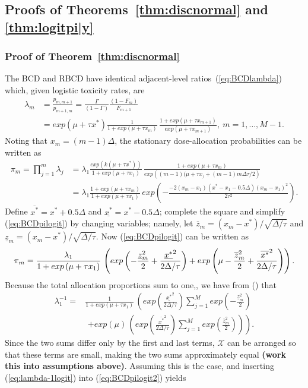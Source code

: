 \subsection{Proofs of Theorems~\ref{thm:discnormal} and \ref{thm:logitpi|y}}\label{sec:logitproofs}
\subsubsection{Proof of Theorem~\ref{thm:discnormal}}
The BCD and RBCD have identical adjacent-level ratios~(\ref{eq:BCDlambda}) which, given logistic toxicity rates, are
\begin{align*}
\lambda_m&=\frac{p_{m,m+1}}{p_{m+1,m}}
=\frac{\Gamma }{(1-\Gamma)}\frac{(1-F_m)}{F_{m+1}}
\\&=exp\left(\mu+\tau x^*\right)\frac{1}{1+exp\left(\mu+\tau x_m\right)}\,
\frac{1+exp\left(\mu+\tau x_{m+1}\right)}{exp\left(\mu+\tau x_{m+1}\right)}, \ m=1,\ldots,M-1.
\end{align*}
Noting that $x_m=(m-1)\Delta$, the stationary dose-allocation probabilities can be written as
\begin{align*}\label{eq:BCDpilogit}
\pi_{m}=\prod_{j=1}^m \lambda_j &= \lambda_1 \frac{exp(k (\mu+\tau x^*))}{1+exp\left(\mu+\tau x_1\right)}\,
\frac{1+exp\left(\mu+\tau x_m\right)}{exp\left((m-1)(\mu+\tau x_)+(m-1)m \Delta \tau/2\right)}\\
&= \lambda_1 \frac{1+exp\left(\mu+\tau x_m\right)}{1+exp\left(\mu+\tau x_1\right)}\,
exp\left(-\frac{-2\left(x_m-x_1\right)\left(x^*-x_1-0.5\Delta\right)\left(x_m-x_1\right)^2}{2\tau^2}
\right).
\end{align*}
Define $\overline{x^*}=x^*+0.5\Delta$ and $\underline{x^*}=x^*-0.5\Delta$; complete the square and simplify (\ref{eq:BCDpilogit}) by changing variables; namely, let
$\overline{z}_m=(x_m-x^*)/\sqrt{\Delta/\tau}$ and $\underline{z}_m=(x_m-x^*)/\sqrt{\Delta/\tau}$.  Now (\ref{eq:BCDpilogit}) can be written as
\begin{equation}\label{{eq:BCDpilogit2}}
\pi_{m}= \frac{\lambda_1}{1+exp\left(\mu+\tau x_1\right)}\,
\left(exp\left(-\frac{\underline{z}_m^2}{2}+\frac{\underline{x^*}^2}{2\Delta/\tau}\right)
+exp\left(\mu-\frac{\overline{z}_m^2}{2}+\frac{\overline{x^*}^2}{2\Delta/\tau}\right)\right).
\end{equation}
Because the total allocation proportions sum to one,, we have from () that
\begin{align}\label{eq:lamda-1logit}
\lambda_1^{-1}= & \frac{1}{1+exp\left(\mu+\tau x_1\right)}\,
\left(exp\left(\frac{\underline{x^*}^2}{2\Delta/\tau}\right)\sum_{j=1}^M exp\left(-\frac{\underline{z}_m^2}{2}\right)\right.\\
&\, \,\left. +exp(\mu)\, \left(exp\left(\frac{\overline{x^*}^2}{2\Delta/\tau}\right)
\sum_{j=1}^M exp\left(\frac{\overline{z}_m^2}{2}\right)\right)\right).
\end{align}
Since the two sums differ only by the first and last terms, $\mathcal{X}$ can be arranged so that these terms are small, making the two sums approximately equal {\bf(work this into assumptions above)}.  Assuming this is the case, and inserting (\ref{eq:lambda-1logit}) into (\ref{eq:BCDpilogit2}) yields

